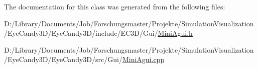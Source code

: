 The documentation for this class was generated from the following files\+:\begin{DoxyCompactItemize}
\item 
D\+:/\+Library/\+Documents/\+Job/\+Forschungsmaster/\+Projekte/\+Simulation\+Visualization/\+Eye\+Candy3\+D/\+Eye\+Candy3\+D/include/\+E\+C3\+D/\+Gui/\mbox{\hyperlink{_mini_agui_8h}{Mini\+Agui.\+h}}\item 
D\+:/\+Library/\+Documents/\+Job/\+Forschungsmaster/\+Projekte/\+Simulation\+Visualization/\+Eye\+Candy3\+D/\+Eye\+Candy3\+D/src/\+Gui/\mbox{\hyperlink{_mini_agui_8cpp}{Mini\+Agui.\+cpp}}\end{DoxyCompactItemize}
